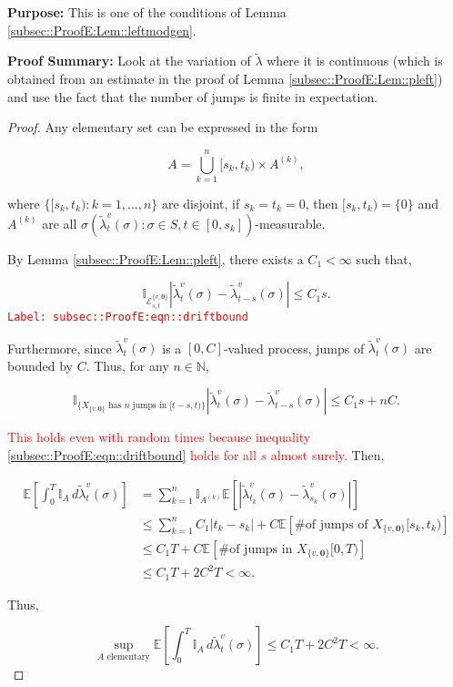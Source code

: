 \documentclass[12pt]{article}
\newcommand{\mb}{\mathbb}
\newcommand{\mc}{\mathcal}
\newcommand{\te}{\text}
\newcommand{\tr}{\textcolor{red}}
\newcommand{\labe}[1]{\tr{\texttt{Label: #1}}}
\newcommand{\purpose}{\textbf{Purpose: }}
\newcommand{\pfsum}{\textbf{Proof Summary: }}
\newcommand{\ex}[1]{\mb{E}\left[#1\right]}			%
\renewcommand{\root}{\mathbf{0}}				%
\renewcommand{\v}{v}							%
\renewcommand{\S}{S}							%
\newcommand{\s}{\sigma}							%
\newcommand{\T}{T}								%
\renewcommand{\t}{t}							%
\renewcommand{\tt}{s}							%
\newcommand{\X}{X}								%
\newcommand{\vind}[1]{^{#1}}					%
\newcommand{\cind}[1]{_{#1}}					%
\newcommand{\tip}[1]{#1}						%
\newcommand{\ts}[1]{_{#1}}						%
\newcommand{\const}{C}							%
\newcommand{\sln}[1]{^{(#1)}}					%
\newcommand{\alt}[1]{\widetilde{#1}}			%
\newcommand{\indx}[1]{_{#1}}					%
\renewcommand{\it}{k}							%
\newcommand{\evnt}{\mc{E}}						%
\newcommand{\typset}{A}							%
\newcommand{\crate}{\alt{\lambda}}				%
\begin{document}
\purpose This is one of the conditions of Lemma \ref{subsec::ProofE:Lem::leftmodgen}.

\pfsum Look at the variation of \(\crate\) where it is continuous (which is obtained from an estimate in the proof of Lemma \ref{subsec::ProofE:Lem::pleft}) and use the fact that the number of jumps is finite in expectation.

\begin{proof}
Any elementary set can be expressed in the form

\[\typset = \bigcup_{\it = 1}^n [\tt\indx{\it},\t\indx{\it})\times \typset\sln{\it},\]

where \(\{[\tt\indx{\it},\t\indx{\it}):\it=1,\dots,n\}\) are disjoint, if \(\tt\indx{\it} = \t\indx{\it} = 0\), then \([\tt\indx{\it},\t\indx{\it}) = \{0\}\) and \(\typset\sln{\it}\) are all \(\sigma(\crate\vind{\v}\ts{\t}(\s):\s \in \S,\t\in [0,\tt\indx{\it}])\)-measurable. 

By Lemma \ref{subsec::ProofE:Lem::pleft}, there exists a \(\const\indx{1} < \infty\) such that,

\begin{equation}
\mb{I}_{\evnt^{\{\v,\root\}}_{\tt,\t}}|\crate\vind{\v}\ts{\t}(\s) - \crate\vind{\v}\ts{\t-\tt}(\s)| \leq \const\indx{1}\tt.
\label{subsec::ProofE:eqn::driftbound}
\end{equation}
\labe{subsec::ProofE:eqn::driftbound}

Furthermore, since \(\crate\vind{\v}\ts{\t}(\s)\) is a \([0,\const]\)-valued process, jumps of \(\crate\vind{\v}\ts{\t}(\s)\) are bounded by \(\const\). Thus, for any \(n \in \mb{N}\),

\[\mb{I}_{\{\X\cind{\{\v,\root\}}\te{ has }n\te{ jumps in } [\t-\tt,\t)\}}|\crate\vind{\v}\ts{\t}(\s) - \crate\vind{\v}\ts{\t-\tt}(\s)|\leq C_1\tt + n \const.\]

\tr{This holds even with random times because inequality \eqref{subsec::ProofE:eqn::driftbound} holds for all \(\tt\) almost surely.} Then,

\begin{align*}
\ex{\int_0^\T \mb{I}_\typset\,d\crate\vind{\v}\ts{\t}(\s)} &= \sum_{\it = 1}^n \mb{I}_{\typset\sln{\it}}\ex{\left|\crate\vind{\v}\ts{\t\indx{k}}(\s) - \crate\vind{\v}\ts{\tt\indx{\it}}(\s)\right|}\\
&\leq \sum_{\it=1}^n \const\indx{1}|\t\indx{\it} - \tt\indx{\it}| + \const\ex{\te{\# of jumps of }\X\cind{\{\v,\root\}}\tip{[\tt\indx{\it},\t\indx{\it})}}\\
&\leq \const\indx{1}\T + \const\ex{\te{\# of jumps in }\X\cind{\{\v,\root\}}\tip{[0,\T)}}\\
&\leq \const\indx{1}\T + 2\const^2\T < \infty.
\end{align*}

Thus,

\[\sup_{\typset\te{ elementary}} \ex{\int_0^\T \mb{I}_\typset\,d\crate\vind{\v}\ts{\t}(\s)} \leq \const\indx{1}\T + 2\const^2\T < \infty.\]
\end{proof}
\end{document}
